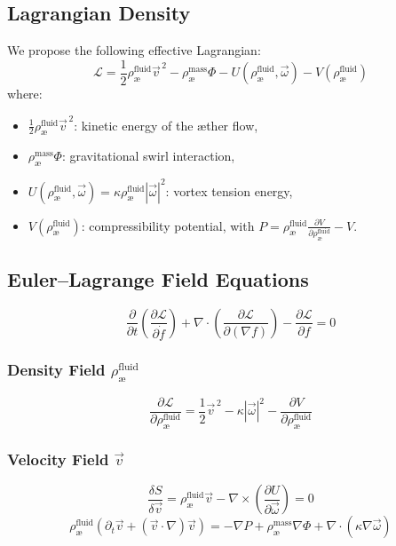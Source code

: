 \subsection{Lagrangian Density}
We propose the following effective Lagrangian:
\begin{equation}
    \mathcal{L} = \frac{1}{2} \rho_\text{\ae}^{\text{fluid}} \vec{v}^{\,2} - \rho_\text{\ae}^{\text{mass}} \Phi - U(\rho_\text{\ae}^{\text{fluid}}, \vec{\omega}) - V(\rho_\text{\ae}^{\text{fluid}})
\end{equation}
where:
\begin{itemize}
    \item $\frac{1}{2} \rho_\text{\ae}^{\text{fluid}} \vec{v}^{\,2}$: kinetic energy of the æther flow,
    \item $\rho_\text{\ae}^{\text{mass}} \Phi$: gravitational swirl interaction,
    \item $U(\rho_\text{\ae}^{\text{fluid}}, \vec{\omega}) = \kappa \rho_\text{\ae}^{\text{fluid}} |\vec{\omega}|^2$: vortex tension energy,
    \item $V(\rho_\text{\ae}^{\text{fluid}})$: compressibility potential, with $P = \rho_\text{\ae}^{\text{fluid}} \frac{\partial V}{\partial \rho_\text{\ae}^{\text{fluid}}} - V$.
\end{itemize}

\subsection{Euler--Lagrange Field Equations}
\begin{equation}
    \frac{\partial}{\partial t} \left( \frac{\partial \mathcal{L}}{\partial \dot{f}} \right) + \nabla \cdot \left( \frac{\partial \mathcal{L}}{\partial (\nabla f)} \right) - \frac{\partial \mathcal{L}}{\partial f} = 0
\end{equation}

\subsubsection*{Density Field \( \rho_\text{\ae}^{\text{fluid}} \)}
\begin{equation}
    \frac{\partial \mathcal{L}}{\partial \rho_\text{\ae}^{\text{fluid}}} = \frac{1}{2} \vec{v}^{\,2} - \kappa |\vec{\omega}|^2 - \frac{\partial V}{\partial \rho_\text{\ae}^{\text{fluid}}}
\end{equation}

\subsubsection{Velocity Field \( \vec{v} \)}
\begin{equation}
    \frac{\delta S}{\delta \vec{v}} = \rho_\text{\ae}^{\text{fluid}} \vec{v} - \nabla \times \left( \frac{\partial U}{\partial \vec{\omega}} \right) = 0
\end{equation}
\begin{equation}
    \rho_\text{\ae}^{\text{fluid}} \left( \partial_t \vec{v} + (\vec{v} \cdot \nabla)\vec{v} \right) = -\nabla P + \rho_\text{\ae}^{\text{mass}} \nabla \Phi + \nabla \cdot \left( \kappa \nabla \vec{\omega} \right)
\end{equation}

